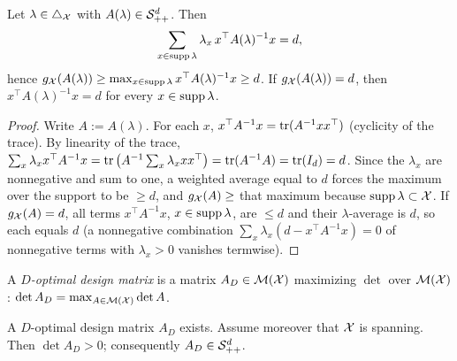 \begin{lemma}\label{lem:g_ge_d}
\leanok
{}
Let $\lambda \in \triangle_{\mathcal{X}}$ with $A(\lambda) \in \mathcal{S}_{++}^{d}$. Then
\[
  \sum_{x \in \operatorname{supp}\lambda} \lambda_x\, x^\top A(\lambda)^{-1} x = d ,
\]
hence $g_{\mathcal{X}}(A(\lambda)) \ge \max_{x\in\operatorname{supp}\lambda} x^\top A(\lambda)^{-1}x \ge d$. If
$g_{\mathcal{X}}(A(\lambda)) = d$, then $x^\top A(\lambda)^{-1} x = d$ for every $x \in \operatorname{supp}\lambda$.
\end{lemma}

\begin{proof}
\leanok
{}
Write $A := A(\lambda)$. For each $x$, $x^\top A^{-1} x = \operatorname{tr}(A^{-1} x x^\top)$ (cyclicity of the
trace). By linearity of the trace,
$\sum_x \lambda_x x^\top A^{-1} x = \operatorname{tr}\big(A^{-1}\sum_x \lambda_x xx^\top\big) = \operatorname{tr}(A^{-1}A) =
\operatorname{tr}(I_d) = d$. Since the $\lambda_x$ are nonnegative and sum to one, a weighted average equal to
$d$ forces the maximum over the support to be $\ge d$, and $g_{\mathcal{X}}(A) \ge$ that maximum because
$\operatorname{supp}\lambda \subset \mathcal{X}$. If $g_{\mathcal{X}}(A) = d$, all terms $x^\top A^{-1}x$, $x \in \operatorname{supp}\lambda$,
are $\le d$ and their $\lambda$-average is $d$, so each equals $d$ (a nonnegative combination
$\sum_x \lambda_x (d - x^\top A^{-1} x) = 0$ of nonnegative terms with $\lambda_x > 0$ vanishes
termwise).
\end{proof}

\begin{definition}\label{def:d_optimal}
A \emph{$D$-optimal design matrix} is a matrix $A_D \in \mathcal{M}(\mathcal{X})$ maximizing $\det$ over
$\mathcal{M}(\mathcal{X})$: $\det A_D = \max_{A \in \mathcal{M}(\mathcal{X})} \det A$.
\end{definition}

\begin{lemma}\label{lem:exists_d_optimal}
\leanok
{}
A $D$-optimal design matrix $A_D$ exists. Assume moreover that $\mathcal{X}$ is spanning. Then
$\det A_D > 0$; consequently $A_D \in \mathcal{S}_{++}^{d}$.
\end{lemma}

